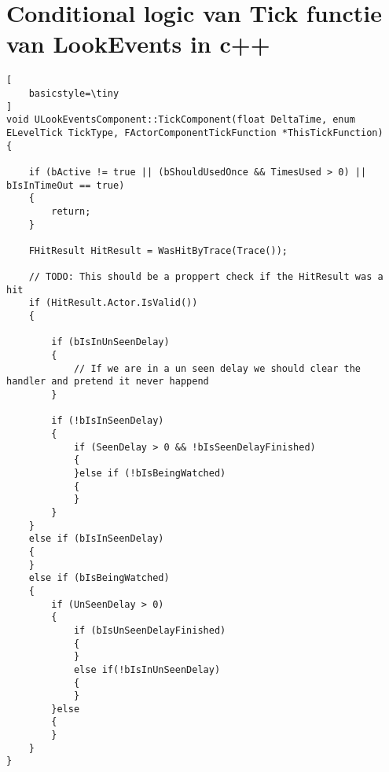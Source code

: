 \chapter{Conditional logic van Tick functie van LookEvents in c++}
\lhead{}
\label{appendix:LookEventsLogicC}

\begin{lstlisting}[
	basicstyle=\tiny
]
void ULookEventsComponent::TickComponent(float DeltaTime, enum ELevelTick TickType, FActorComponentTickFunction *ThisTickFunction) 
{

	if (bActive != true || (bShouldUsedOnce && TimesUsed > 0) || bIsInTimeOut == true) 
	{
		return;
	}

	FHitResult HitResult = WasHitByTrace(Trace());

	// TODO: This should be a proppert check if the HitResult was a hit 
	if (HitResult.Actor.IsValid())
	{

		if (bIsInUnSeenDelay) 
		{
			// If we are in a un seen delay we should clear the handler and pretend it never happend
		}

		if (!bIsInSeenDelay) 
		{
			if (SeenDelay > 0 && !bIsSeenDelayFinished) 
			{
			}else if (!bIsBeingWatched) 
			{		
			}
		}
	}
	else if (bIsInSeenDelay)
	{
	}
	else if (bIsBeingWatched) 
	{
		if (UnSeenDelay > 0) 
		{
			if (bIsUnSeenDelayFinished) 
			{				
			}
			else if(!bIsInUnSeenDelay)
			{					
			}
		}else
		{
		}
	}
}
\end{lstlisting}